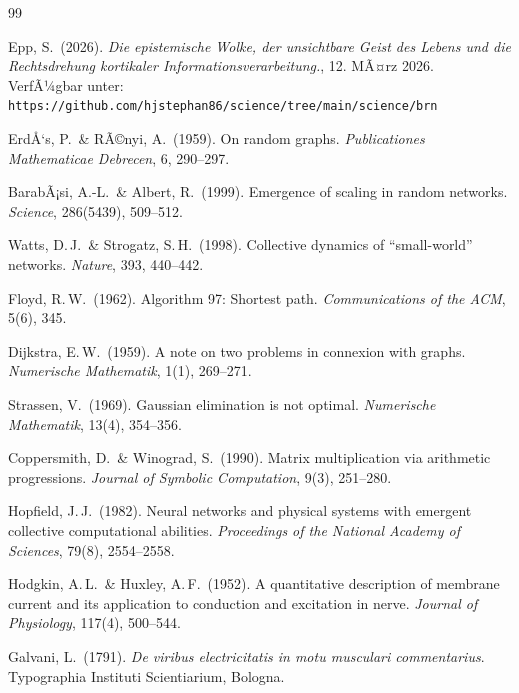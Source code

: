 ﻿\documentclass[a4paper,12pt]{article}
\theoremstyle{definition}
\begin{document}
	\begin{thebibliography}{99}

	Epp, S.\ (2026).
	\textit{Die epistemische Wolke, der unsichtbare Geist des Lebens und die
	Rechtsdrehung kortikaler Informationsverarbeitung.}, 12. MÃ¤rz 2026.
	VerfÃ¼gbar unter: \texttt{https://github.com/hjstephan86/science/tree/main/science/brn}

	ErdÅ‘s, P.\ \& RÃ©nyi, A.\ (1959).
	On random graphs.
	\textit{Publicationes Mathematicae Debrecen}, 6, 290--297.

	BarabÃ¡si, A.-L.\ \& Albert, R.\ (1999).
	Emergence of scaling in random networks.
	\textit{Science}, 286(5439), 509--512.

	Watts, D.\,J.\ \& Strogatz, S.\,H.\ (1998).
	Collective dynamics of ``small-world'' networks.
	\textit{Nature}, 393, 440--442.

	Floyd, R.\,W.\ (1962).
	Algorithm 97: Shortest path.
	\textit{Communications of the ACM}, 5(6), 345.

	Dijkstra, E.\,W.\ (1959).
	A note on two problems in connexion with graphs.
	\textit{Numerische Mathematik}, 1(1), 269--271.

	Strassen, V.\ (1969).
	Gaussian elimination is not optimal.
	\textit{Numerische Mathematik}, 13(4), 354--356.

	Coppersmith, D.\ \& Winograd, S.\ (1990).
	Matrix multiplication via arithmetic progressions.
	\textit{Journal of Symbolic Computation}, 9(3), 251--280.

	Hopfield, J.\,J.\ (1982).
	Neural networks and physical systems with emergent collective computational abilities.
	\textit{Proceedings of the National Academy of Sciences}, 79(8), 2554--2558.

	Hodgkin, A.\,L.\ \& Huxley, A.\,F.\ (1952).
	A quantitative description of membrane current and its application to conduction and excitation in nerve.
	\textit{Journal of Physiology}, 117(4), 500--544.

	Galvani, L.\ (1791).
	\textit{De viribus electricitatis in motu musculari commentarius}.
	Typographia Instituti Scientiarium, Bologna.


\end{thebibliography}
\end{document}
